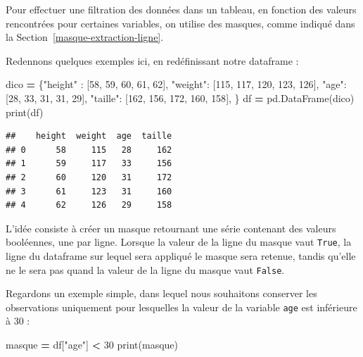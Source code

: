 \documentclass[
  12pt,
]{book}
\newenvironment{Shaded}{\begin{snugshade}}{\end{snugshade}}
\newcommand{\BuiltInTok}[1]{#1}
\newcommand{\DecValTok}[1]{\textcolor[rgb]{0.00,0.00,0.81}{#1}}
\newcommand{\NormalTok}[1]{#1}
\newcommand{\OperatorTok}[1]{\textcolor[rgb]{0.81,0.36,0.00}{\textbf{#1}}}
\newcommand{\StringTok}[1]{\textcolor[rgb]{0.31,0.60,0.02}{#1}}
\numberwithin{equation}{section}
\numberwithin{countremarque}{section}
\begin{document}
Pour effectuer une filtration des données dans un tableau, en fonction des valeurs rencontrées pour certaines variables, on utilise des masques, comme indiqué dans la Section~\ref{masque-extraction-ligne}.

Redennons quelques exemples ici, en redéfinissant notre dataframe :

\begin{Shaded}
\begin{Highlighting}[]
\NormalTok{dico }\OperatorTok{=}\NormalTok{ \{}\StringTok{"height"}\NormalTok{ : [}\DecValTok{58}\NormalTok{, }\DecValTok{59}\NormalTok{, }\DecValTok{60}\NormalTok{, }\DecValTok{61}\NormalTok{, }\DecValTok{62}\NormalTok{],}
        \StringTok{"weight"}\NormalTok{: [}\DecValTok{115}\NormalTok{, }\DecValTok{117}\NormalTok{, }\DecValTok{120}\NormalTok{, }\DecValTok{123}\NormalTok{, }\DecValTok{126}\NormalTok{],}
        \StringTok{"age"}\NormalTok{: [}\DecValTok{28}\NormalTok{, }\DecValTok{33}\NormalTok{, }\DecValTok{31}\NormalTok{, }\DecValTok{31}\NormalTok{, }\DecValTok{29}\NormalTok{],}
        \StringTok{"taille"}\NormalTok{: [}\DecValTok{162}\NormalTok{, }\DecValTok{156}\NormalTok{, }\DecValTok{172}\NormalTok{, }\DecValTok{160}\NormalTok{, }\DecValTok{158}\NormalTok{],}
\NormalTok{       \} }
\NormalTok{df }\OperatorTok{=}\NormalTok{ pd.DataFrame(dico)}
\BuiltInTok{print}\NormalTok{(df)}
\end{Highlighting}
\end{Shaded}

\begin{lstlisting}
##    height  weight  age  taille
## 0      58     115   28     162
## 1      59     117   33     156
## 2      60     120   31     172
## 3      61     123   31     160
## 4      62     126   29     158
\end{lstlisting}

L'idée consiste à créer un masque retournant une série contenant des valeurs booléennes, une par ligne. Lorsque la valeur de la ligne du masque vaut \texttt{True}, la ligne du dataframe sur lequel sera appliqué le masque sera retenue, tandis qu'elle ne le sera pas quand la valeur de la ligne du masque vaut \texttt{False}.

Regardons un exemple simple, dans lequel nous souhaitons conserver les observations uniquement pour lesquelles la valeur de la variable \texttt{age} est inférieure à 30 :

\begin{Shaded}
\begin{Highlighting}[]
\NormalTok{masque }\OperatorTok{=}\NormalTok{ df[}\StringTok{"age"}\NormalTok{] }\OperatorTok{\textless{}} \DecValTok{30}
\BuiltInTok{print}\NormalTok{(masque)}
\end{Highlighting}
\end{Shaded}
\end{document}
